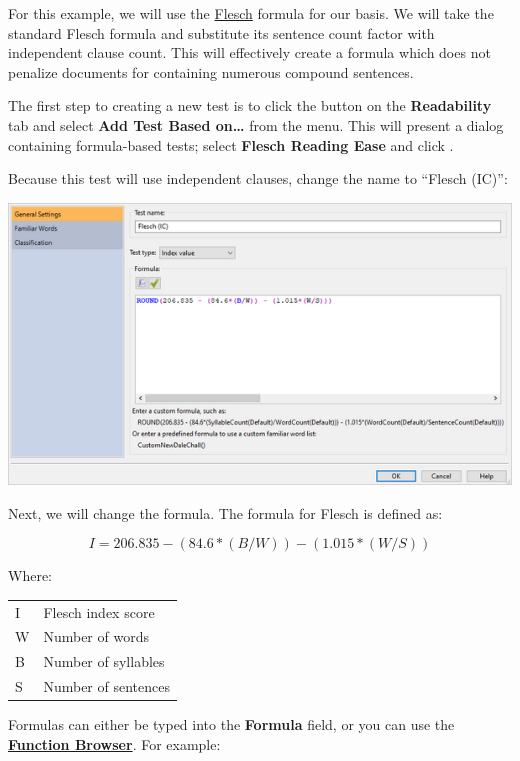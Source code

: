 \documentclass[
]{book}
\theoremstyle{definition}
\theoremstyle{definition}
\theoremstyle{definition}
\theoremstyle{definition}
\theoremstyle{remark}
\begin{document}
For this example, we will use the \protect\hyperlink{flesch-test}{Flesch} formula for our basis. We will take the standard Flesch formula and substitute its sentence count factor with independent clause count. This will effectively create a formula which does not penalize documents for containing numerous compound sentences.

The first step to creating a new test is to click the  button on the \textbf{Readability} tab and select \textbf{Add Test Based on\ldots{}} from the menu. This will present a dialog containing formula-based tests; select \textbf{Flesch Reading Ease} and click .

Because this test will use independent clauses, change the name to ``Flesch (IC)'':

\includegraphics{Images/CustomTestExample1TestName.png}

Next, we will change the formula. The formula for Flesch is defined as:

\[
I = 206.835 - (84.6*(B/W)) - (1.015*(W/S))
\]

Where:

\begin{longtable}[]{@{}
  >{\raggedright\arraybackslash}p{}
  >{\raggedright\arraybackslash}p{}@{}}
\toprule
\endhead
I & Flesch index score \\
W & Number of words \\
B & Number of syllables \\
S & Number of sentences \\
\bottomrule
\end{longtable}

Formulas can either be typed into the \textbf{Formula} field, or you can use the \protect\hyperlink{creating-custom-test}{\textbf{Function Browser}}. For example:
\end{document}
